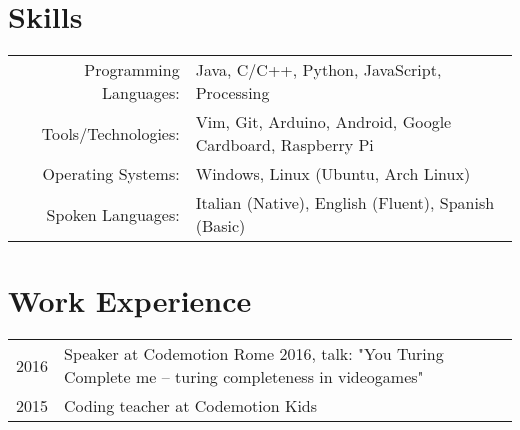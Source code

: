 \documentclass[a4paper,10pt]{article} %
\begin{document}
\section{Skills}
\begin{tabular}{rl}
Programming Languages: & Java, C/C++, Python, JavaScript, Processing\\
Tools/Technologies: & Vim, Git, Arduino, Android, Google Cardboard, Raspberry Pi\\
Operating Systems: & Windows, Linux (Ubuntu, Arch Linux)\\
Spoken Languages: & Italian (Native), English (Fluent), Spanish (Basic)\\
\end{tabular}

\bigskip

\section{Work Experience}
    \begin{tabular}{rl}	
        2016 & Speaker at Codemotion Rome 2016, talk: "You Turing Complete me – turing completeness in videogames"\\
        2015 & Coding teacher at Codemotion Kids \\
    \end{tabular}

\bigskip

\end{document}

